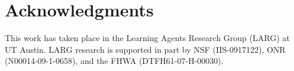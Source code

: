 \documentclass{sig-alternate}
\begin{document}
\section{Acknowledgments}
This work has taken place in the Learning Agents Research Group (LARG) at UT Austin.  LARG research is supported in part by NSF (IIS-0917122), ONR (N00014-09-1-0658), and the FHWA (DTFH61-07-H-00030).


\end{document}
